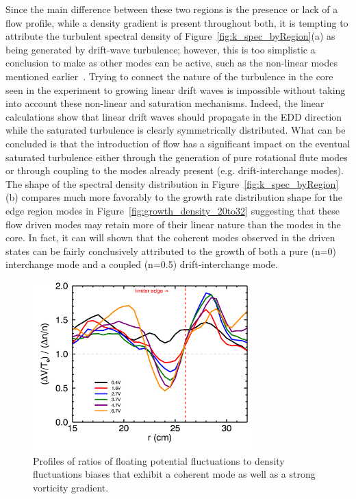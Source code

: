 \documentclass[aip,pop,amsmath,amssymb,reprint,superscriptaddress]{revtex4-1} %
\begin{document}
Since the main difference between these two regions is the presence or lack of a flow profile, while a density gradient is present throughout both, it is tempting to attribute the turbulent spectral density of Figure~\ref{fig:k_spec_byRegion}(a) as being generated by drift-wave turbulence; however, this is too simplistic a conclusion to make as other modes can be active, such as the non-linear modes mentioned earlier~\cite{friedman12}. Trying to connect the nature of the turbulence in the core seen in the experiment to growing linear drift waves is impossible without taking into account these non-linear and saturation mechanisms. Indeed, the linear calculations show that linear drift waves should propagate in the EDD direction while the saturated turbulence is clearly symmetrically distributed.  What can be concluded is that the introduction of flow has a significant impact on the eventual saturated turbulence either through the generation of pure rotational flute modes or through coupling to the modes already present (e.g. drift-interchange modes). The shape of the spectral density distribution in Figure~\ref{fig:k_spec_byRegion}(b) compares much more favorably to the growth rate distribution shape for the edge region modes in Figure~\ref{fig:growth_density_20to32} suggesting that these flow driven modes may retain more of their linear nature than the modes in the core. In fact, it can will shown that the coherent modes observed in the driven states can be fairly conclusively attributed to the growth of both a pure (n=0) interchange mode and a coupled (n=0.5) drift-interchange mode.

\begin{figure}[!htbp]
\centerline{
\includegraphics[width=8.5cm]{deltaV_over_deltaN_cohmode}}%
\caption{\label{fig:deltaV_over_deltaN_cohmode} Profiles of ratios of floating potential fluctuations to density fluctuations biases that exhibit a coherent mode as well as a strong vorticity gradient.}
\end{figure}
\end{document}
